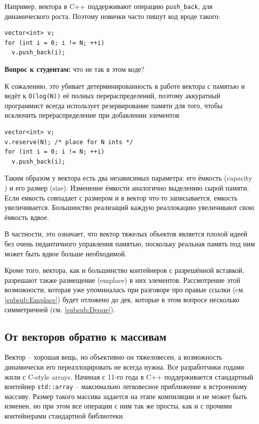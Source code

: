 \documentclass[a4paper,12pt,oneside]{book}
\newif\ifanswers
\begin{document}
Например, вектора в C++ поддерживают операцию \lstinline!push_back!, для динамического роста. Поэтому новички часто пишут код вроде такого:

\begin{lstlisting}
vector<int> v;
for (int i = 0; i != N; ++i)
  v.push_back(i);
\end{lstlisting}

\textbf{Вопрос к студентам:} что не так в этом коде?

\ifanswers
См. ответ далее в тексте лекций
\fi

К сожалению, это убивает детерминированность в работе вектора с памятью и ведёт к \lstinline!O(log(N))! её полных перераспределений, поэтому аккуратный программист всегда использует резервирование памяти для того, чтобы исключить перераспределение при добавлении элементов

\begin{lstlisting}
vector<int> v;
v.reserve(N); /* place for N ints */
for (int i = 0; i != N; ++i)
  v.push_back(i);
\end{lstlisting}

Таким образом у вектора есть два независимых параметра: его ёмкость (capacity ) и его размер (size). Изменение ёмкости аналогично выделению сырой памяти. Если емкость совпадает с размером и в вектор что-то записывается, емкость увеличивается. Большинство реализаций каждую реаллокацию увеличивают свою ёмкость вдвое.

В частности, это означает, что вектор тяжелых объектов является плохой идеей без очень педантичного управления памятью, поскольку реальная память под ним может быть вдвое больше необходимой. 

Кроме того, вектора, как и большинство контейнеров с разрешённой вставкой, разрешают также размещение (emplace) в них элементов. Рассмотрение этой возможности, которая уже упоминалась при разговоре про правые ссылки (cм. \ref{subsub:Emplace}) будет отложено до дек, которые в этом вопросе несколько симметричней (см. \ref{subsub:Deque}).

\subsection{От векторов обратно к массивам}\label{InvArrays}

Вектор -- хорошая вещь, но объективно он тяжеловесен, а возможность динамически его переаллоцировать не всегда нужна. Все разработчики годами жили с C-style arrays. Начиная с 11-го года в C++ поддерживается стандартный контейнер \lstinline!std::array! -- максимально легковесное приближение к встроенному массиву. Размер такого массива задается на этапе компиляции и не может быть изменен, но при этом все операции с ним так же просты, как и с прочими контейнерами стандартной библиотеки.
\end{document}
